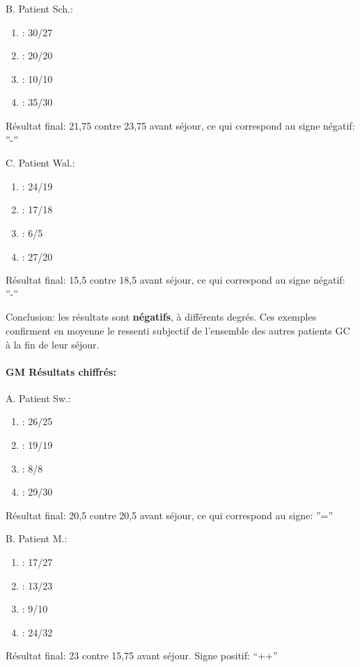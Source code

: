         
        B. Patient Sch.:

	\begin{enumerate}
 		\item : 30/27 
 		\item : 20/20
 		\item : 10/10
 		\item : 35/30
         \end{enumerate}
                Résultat final: 21,75 contre 23,75 avant séjour, ce qui
        correspond au signe négatif: ''-''

                
                C. Patient Wal.:
	\begin{enumerate}
 		\item : 24/19
 		\item : 17/18
 		\item : 6/5
 		\item : 27/20
 	\end{enumerate}
        Résultat final: 15,5 contre 18,5 avant séjour, ce qui
        correspond au signe négatif: ''-''

        Conclusion: les résultats sont \textbf{négatifs}, à différents degrés.
        Ces exemples confirment en moyenne 
        le ressenti subjectif de l'ensemble des autres patients GC à la fin de leur séjour.

        \paragraph{GM Résultats chiffrés:}


        
   A. Patient Sw.:
	\begin{enumerate}
 		\item : 26/25 
 		\item : 19/19
 		\item : 8/8
 		\item : 29/30
 	\end{enumerate}
        Résultat final: 20,5 contre 20,5 avant séjour, ce qui
        correspond au signe:  ''=''

        
        B. Patient M.:
	\begin{enumerate}
 		\item : 17/27 
 		\item : 13/23
 		\item : 9/10
 		\item : 24/32
                \end{enumerate}
                 Résultat final: 23 contre 15,75 avant séjour. Signe positif:  ``++''

